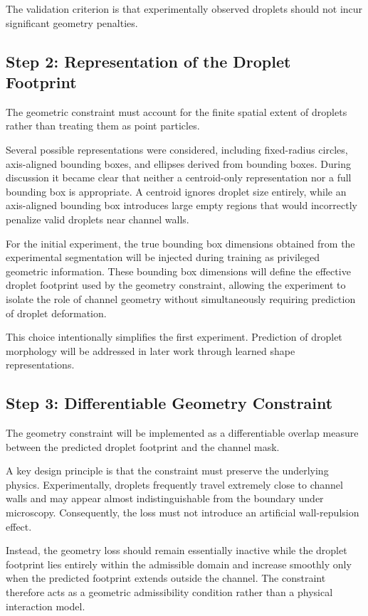 \documentclass[11pt]{article}
\begin{document}
The validation criterion is that experimentally observed droplets should not incur significant geometry penalties.

\subsection{Step 2: Representation of the Droplet Footprint}

The geometric constraint must account for the finite spatial extent of droplets rather than treating them as point particles.

Several possible representations were considered, including fixed-radius circles, axis-aligned bounding boxes, and ellipses derived from bounding boxes. During discussion it became clear that neither a centroid-only representation nor a full bounding box is appropriate. A centroid ignores droplet size entirely, while an axis-aligned bounding box introduces large empty regions that would incorrectly penalize valid droplets near channel walls.

For the initial experiment, the true bounding box dimensions obtained from the experimental segmentation will be injected during training as privileged geometric information. These bounding box dimensions will define the effective droplet footprint used by the geometry constraint, allowing the experiment to isolate the role of channel geometry without simultaneously requiring prediction of droplet deformation.

This choice intentionally simplifies the first experiment. Prediction of droplet morphology will be addressed in later work through learned shape representations.

\subsection{Step 3: Differentiable Geometry Constraint}

The geometry constraint will be implemented as a differentiable overlap measure between the predicted droplet footprint and the channel mask.

A key design principle is that the constraint must preserve the underlying physics. Experimentally, droplets frequently travel extremely close to channel walls and may appear almost indistinguishable from the boundary under microscopy. Consequently, the loss must not introduce an artificial wall-repulsion effect.

Instead, the geometry loss should remain essentially inactive while the droplet footprint lies entirely within the admissible domain and increase smoothly only when the predicted footprint extends outside the channel. The constraint therefore acts as a geometric admissibility condition rather than a physical interaction model.
\end{document}
